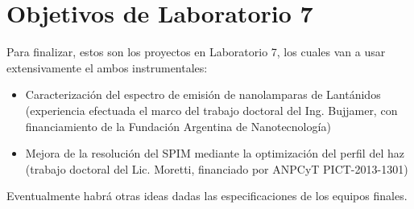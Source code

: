 \documentclass{article}
\begin{document}
\section{Objetivos de Laboratorio 7}
Para finalizar, estos son los proyectos en Laboratorio 7, los cuales van a usar extensivamente el ambos instrumentales:
\begin{itemize}
\item Caracterización del espectro de emisión de nanolamparas de Lantánidos (experiencia efectuada el marco del trabajo doctoral del Ing. Bujjamer, con financiamiento de la Fundación Argentina de Nanotecnología)
\item Mejora de la resolución del SPIM mediante la optimización del perfil del haz (trabajo doctoral del Lic. Moretti, financiado por ANPCyT PICT-2013-1301)
\end{itemize}

Eventualmente habrá otras ideas dadas las especificaciones de los equipos finales.
\end{document}
